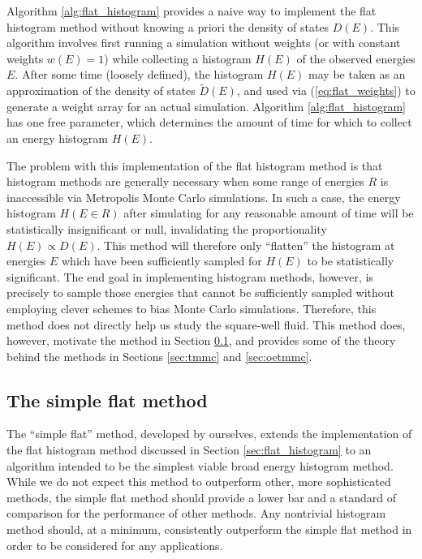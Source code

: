 \documentclass[11pt]{article}
\newcommand{\p}[1]{\left(#1\right)} %
\begin{document}
Algorithm \ref{alg:flat_histogram} provides a naive way to implement
the flat histogram method without knowing a priori the density of
states $D\p{E}$. This algorithm involves first running a simulation
without weights (or with constant weights $w\p{E}=1$) while collecting
a histogram $H\p{E}$ of the observed energies $E$. After some time
(loosely defined), the histogram $H\p{E}$ may be taken as an
approximation of the density of states $\tilde D\p{E}$, and used via
(\ref{eq:flat_weights}) to generate a weight array for an actual
simulation. Algorithm \ref{alg:flat_histogram} has one free parameter,
which determines the amount of time for which to collect an energy
histogram $H\p{E}$.

The problem with this implementation of the flat histogram method is
that histogram methods are generally necessary when some range of
energies $R$ is inaccessible via Metropolis Monte Carlo
simulations. In such a case, the energy histogram $H\p{E\in R}$ after
simulating for any reasonable amount of time will be statistically
insignificant or null, invalidating the proportionality $H\p{E}\propto
D\p{E}$. This method will therefore only ``flatten'' the histogram at
energies $E$ which have been sufficiently sampled for $H\p{E}$ to be
statistically significant. The end goal in implementing histogram
methods, however, is precisely to sample those energies that cannot be
sufficiently sampled without employing clever schemes to bias Monte
Carlo simulations. Therefore, this method does not directly help us
study the square-well fluid. This method does, however, motivate the
method in Section \ref{sec:simple_flat}, and provides some of the
theory behind the methods in Sections \ref{sec:tmmc} and
\ref{sec:oetmmc}.

\subsection{The simple flat method}
\label{sec:simple_flat}

The ``simple flat'' method, developed by ourselves, extends the
implementation of the flat histogram method discussed in Section
\ref{sec:flat_histogram} to an algorithm intended to be the simplest
viable broad energy histogram method. While we do not expect this
method to outperform other, more sophisticated methods, the simple
flat method should provide a lower bar and a standard of comparison
for the performance of other methods. Any nontrivial histogram method
should, at a minimum, consistently outperform the simple flat method
in order to be considered for any applications.
\end{document}
